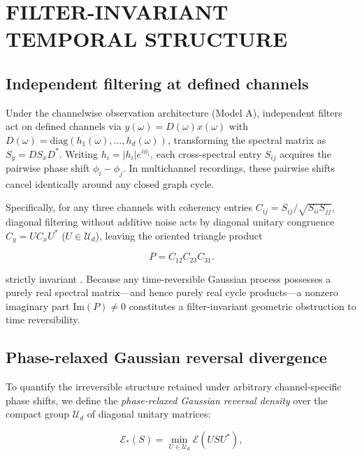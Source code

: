 \documentclass[aps,pre,reprint,amsmath,amssymb,superscriptaddress]{revtex4-2}
\begin{document}
\section{FILTER-INVARIANT TEMPORAL STRUCTURE}

\subsection{Independent filtering at defined channels}

Under the channelwise observation architecture (Model A), independent filters act on defined channels via $y(\omega) = D(\omega)x(\omega)$ with $D(\omega) = \mathrm{diag}(h_1(\omega), \dots, h_d(\omega))$, transforming the spectral matrix as $S_y = D S_x D^*$. Writing $h_i = |h_i|e^{i\phi_i}$, each cross-spectral entry $S_{ij}$ acquires the pairwise phase shift $\phi_i - \phi_j$. In multichannel recordings, these pairwise shifts cancel identically around any closed graph cycle.

Specifically, for any three channels with coherency entries $C_{ij} = S_{ij}/\sqrt{S_{ii}S_{jj}}$, diagonal filtering without additive noise acts by diagonal unitary congruence $C_y = U C_x U^*$ ($U \in \mathcal{U}_d$), leaving the oriented triangle product

\begin{equation}\label{eq:16}
\boxed{
P=C_{12}C_{23}C_{31}.
}
\end{equation}



strictly invariant \cite{thyagarajan2022,chien2016}. Because any time-reversible Gaussian process possesses a purely real spectral matrix---and hence purely real cycle products---a nonzero imaginary part $\mathrm{Im}(P) \neq 0$ constitutes a filter-invariant geometric obstruction to time reversibility.

\subsection{Phase-relaxed Gaussian reversal divergence}

To quantify the irreversible structure retained under arbitrary channel-specific phase shifts, we define the \emph{phase-relaxed Gaussian reversal density} over the compact group $\mathcal{U}_d$ of diagonal unitary matrices:

\begin{equation}\label{eq:17}
\boxed{
\mathcal E_*(S)
=
\min_{U\in\mathcal U_d}
\mathcal E(USU^*),
}
\end{equation}
\end{document}
